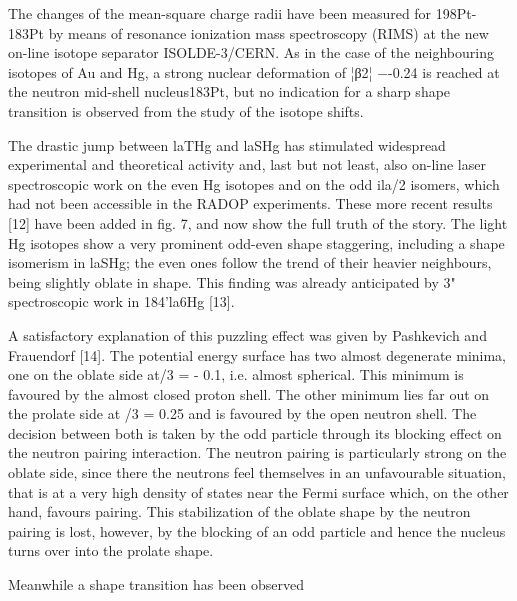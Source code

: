 The changes of the mean-square charge radii have been measured for 198Pt-183Pt by means of resonance ionization mass spectroscopy (RIMS) at the new on-line isotope separator ISOLDE-3/CERN. As in the case of the neighbouring isotopes of Au and Hg, a strong nuclear deformation of ¦β2¦ −-0.24 is reached at the neutron mid-shell nucleus183Pt, but no indication for a sharp shape transition is observed from the study of the isotope shifts.




The drastic jump between laTHg and laSHg has stimulated widespread experimental
and theoretical activity and, last but not least, also on-line laser spectroscopic
work on the even Hg isotopes and on the odd ila/2 isomers, which had not been
accessible in the RADOP experiments. These more recent results [12] have been
added in fig. 7, and now show the full truth of the story. The light Hg isotopes show a
very prominent odd-even shape staggering, including a shape isomerism in laSHg; the
even ones follow the trend of their heavier neighbours, being slightly oblate in shape.
This finding was already anticipated by 3" spectroscopic work in 184'la6Hg [13]. 

A satisfactory explanation of this puzzling effect was given by Pashkevich
and Frauendorf [14]. The potential energy surface has two almost degenerate minima,
one on the oblate side at/3 = - 0.1, i.e. almost spherical. This minimum is favoured
by the almost closed proton shell. The other minimum lies far out on the prolate side
at /3 = 0.25 and is favoured by the open neutron shell. The decision between both is
taken by the odd particle through its blocking effect on the neutron pairing interaction.
The neutron pairing is particularly strong on the oblate side, since there the
neutrons feel themselves in an unfavourable situation, that is at a very high density
of states near the Fermi surface which, on the other hand, favours pairing. This stabilization
of the oblate shape by the neutron pairing is lost, however, by the blocking of
an odd particle and hence the nucleus turns over into the prolate shape. 



Meanwhile a shape transition has been observed

